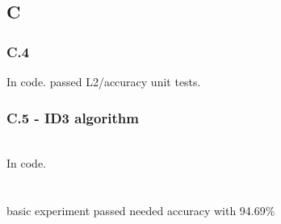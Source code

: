 \documentclass[12pt]{article}
\begin{document}
\subsection*{C}
\subsubsection*{C.4}
In code. passed L2/accuracy unit tests.
\subsubsection*{C.5 - ID3 algorithm}
\\
In code.\\
\\
\\
basic experiment passed needed accuracy with 94.69\%
\end{document}
